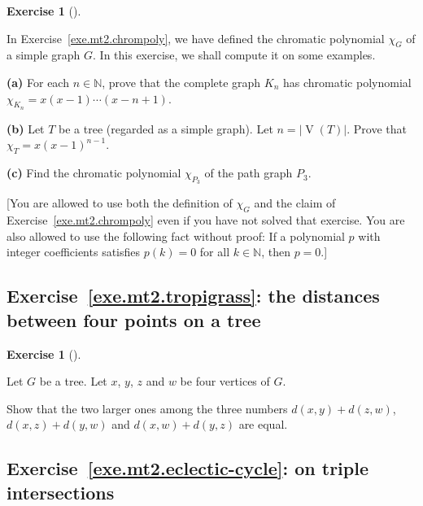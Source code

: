 \documentclass[numbers=enddot,12pt,final,onecolumn,notitlepage]{scrartcl}%
\newcounter{exer}
\theoremstyle{definition}
\newtheorem{exmp}[exer]{Exercise}
\newenvironment{exercise}[1][]
{\begin{exmp}[#1]\begin{leftbar}}
{\end{leftbar}\end{exmp}}
\newcommand{\NN}{\mathbb{N}}
\newcommand{\abs}[1]{\left| #1 \right|}
\newcommand{\tup}[1]{\left( #1 \right)}
\newcommand{\verts}[1]{\operatorname{V}\left( #1 \right)}
\begin{document}
\begin{exercise} \label{exe.mt2.chrompoly-examples}
In Exercise~\ref{exe.mt2.chrompoly}, we have defined the chromatic
polynomial $\chi_G$ of a simple graph $G$.
In this exercise, we shall compute it on some examples.

\textbf{(a)} For each $n \in \NN$, prove that the complete graph $K_n$
has chromatic polynomial
$\chi_{K_n} = x \tup{x-1} \cdots \tup{x-n+1}$.

\textbf{(b)} Let $T$ be a tree (regarded as a simple graph).
Let $n = \abs{\verts{T}}$.
Prove that $\chi_T = x \tup{x-1}^{n-1}$.

\textbf{(c)} Find the chromatic polynomial $\chi_{P_3}$ of the path
graph $P_3$.

[You are allowed to use both the definition of $\chi_G$ and the claim
of Exercise~\ref{exe.mt2.chrompoly} even if you have not solved that
exercise.
You are also allowed to use the following fact without proof:
If a polynomial $p$ with integer coefficients satisfies
$p \tup{k} = 0$ for all $k \in \NN$, then $p = 0$.]
\end{exercise}

\subsection{Exercise~\ref{exe.mt2.tropigrass}:
the distances between four points on a tree}

\begin{exercise} \label{exe.mt2.tropigrass}
Let $G$ be a tree.
Let $x$, $y$, $z$ and $w$ be four vertices of $G$.

Show that the two larger ones among the three numbers
$d \tup{x, y} + d \tup{z, w}$,
$d \tup{x, z} + d \tup{y, w}$ and
$d \tup{x, w} + d \tup{y, z}$
are equal.
\end{exercise}

\subsection{Exercise~\ref{exe.mt2.eclectic-cycle}:
on triple intersections}
\end{document}
